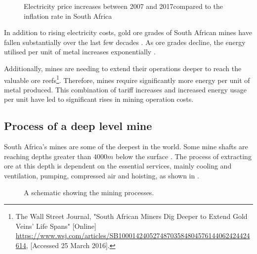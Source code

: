 		\begin{figure}[h]
			\centering
			\fbox{}
			\caption[Electricity price increases between 2007 and 2017 compared to the inflation rate in South Africa]{Electricity price increases between 2007 and 2017\protect\footnotemark[1] compared to the inflation rate in South Africa\protect\footnotemark[2]}
			\label{fig: Eskom tariffs}
		\end{figure}
	\clearpage
		\par
		In addition to rising electricity costs, gold ore grades of South African mines have fallen substantially over the last few decades \cite{mudd2007global}. As ore grades decline, the energy utilised per unit of metal increases exponentially \cite{muller2010numerical}. 
		\par
		Additionally, mines are needing to extend their operations deeper to reach the valuable ore reefs\footnote{The Wall Street Journal, "South African Miners Dig Deeper to Extend Gold Veins' Life Spans" [Online] \url{https://www.wsj.com/articles/SB10001424052748703584804576144062424424614}, [Accessed 25 March 2016].}. Therefore, mines require significantly more energy per unit of metal produced. This combination of tariff increases and increased energy usage per unit have led to significant rises in mining operation costs.
	\subsection{Process of a deep level mine}
	South Africa's mines are some of the deepest in the world. Some mine shafts are reaching depths greater than $4000m$ below the surface \cite{vosloo2012case}. The process of extracting ore at this depth is dependent on the essential services, mainly cooling and ventilation, pumping, compressed air and hoisting, as shown in .
	\par 
	\begin{figure}[h!]
		\centering
		\caption{A schematic showing the mining processes.}
		\label{fig: Mining Layout}
	\end{figure}
	
